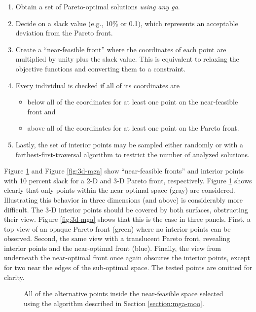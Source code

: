 \begin{enumerate}
    \item Obtain a set of Pareto-optimal solutions \textit{using any \ac{ga}}.
    \item Decide on a slack value (e.g., 10\% or 0.1), which represents an
    acceptable deviation from the Pareto front.
    \item Create a ``near-feasible front'' where the coordinates of each point
    are multiplied by unity plus the slack value. This is equivalent to relaxing
    the objective functions and converting them to a constraint. 
    \item Every individual is checked if all of its coordinates are
    \begin{itemize}
        \item below all of the coordinates for at least one point on the
        near-feasible front and
        \item above all of the coordinates for at least one point on the Pareto
        front.
    \end{itemize}  
    \item Lastly, the set of interior points may be sampled either randomly or with a
    farthest-first-traversal algorithm to restrict the number of analyzed solutions.
\end{enumerate}
\noindent
Figure \ref{fig:nd-mga} and Figure \ref{fig:3d-mga} show ``near-feasible fronts''
and interior points with 10 percent slack for a 2-D and 3-D Pareto front, respectively. 
Figure
\ref{fig:nd-mga} shows clearly that only points within the near-optimal space
(gray) are considered. Illustrating this behavior in three dimensions (and
above) is considerably more difficult. The 3-D interior points should be covered
by both surfaces, obstructing their view. Figure \ref{fig:3d-mga} shows that
this is the case in three panels. First, a top view of an opaque Pareto front
(green) where no interior points can be observed. Second, the same view with a
translucent Pareto front, revealing interior points and the near-optimal front
(blue). Finally, the view from underneath the near-optimal front once again
obscures the interior points, except for two near the edges of the sub-optimal
space. The tested points are omitted for clarity.

\begin{figure}[h]
  \centering
  \resizebox{0.6\columnwidth}{!}{}
  \caption{All of the alternative points inside the near-feasible space selected
  using the algorithm described in Section \ref{section:mga-moo}.}
  \label{fig:nd-mga}
\end{figure}

